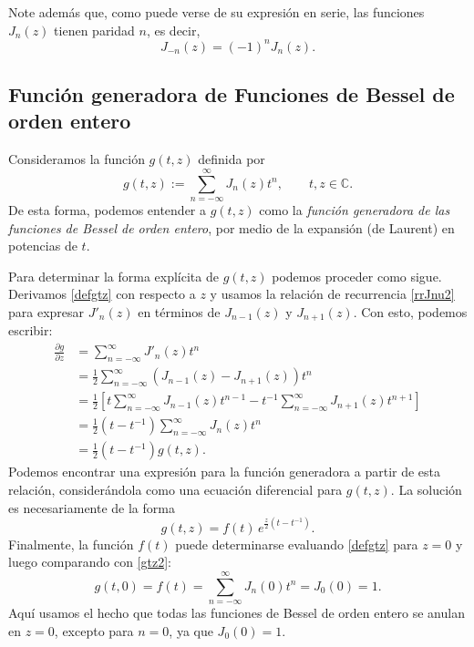 Note además que, como puede verse de su expresión en serie, las funciones $J_n(z)$ tienen paridad $n$, es decir,
\begin{equation}\label{J-nJn}
J_{-n}(z)=(-1)^nJ_n(z).
\end{equation}

\subsection{Función generadora de Funciones de Bessel de orden entero}
Consideramos la función $g(t,z)$ definida por
\begin{equation}\label{defgtz}
g(t,z):=\sum_{n = -\infty}^\infty J_n(z) t^n, \qquad t,z\in \mathbb{C}.
\end{equation}
De esta forma, podemos entender a $g(t,z)$ como la \textit{función generadora de las funciones de Bessel de orden entero}, por medio de la expansión (de Laurent) en potencias de $t$.

Para determinar la forma explícita de $g(t,z)$ podemos proceder como sigue. Derivamos \eqref{defgtz} con respecto a $z$ y usamos la relación de recurrencia \eqref{rrJnu2} para expresar $J'_n(z)$ en términos de  $J_{n-1}(z)$ y $J_{n+1}(z)$. Con esto, podemos escribir:
\begin{align}
\frac{\partial g}{\partial z} &= \sum_{n=-\infty}^\infty J'_n(z) t^n \\
&= \frac{1}{2}\sum_{n=-\infty}^\infty \left(J_{n-1}(z)-J_{n+1}(z)\right) t^n \\
&= \frac{1}{2}\left[t\sum_{n=-\infty}^\infty J_{n-1}(z)t^{n-1}-t^{-1}\sum_{n=-\infty}^\infty J_{n+1}(z)t^{n+1} \right]\\
&= \frac{1}{2}\left(t-t^{-1}\right)\sum_{n = -\infty}^\infty J_n(z) t^n\\
&= \frac{1}{2}\left(t-t^{-1}\right)g(t,z).
\end{align}
Podemos encontrar una expresión para la función generadora a partir de esta relación, considerándola como una ecuación diferencial para $g(t,z)$. La solución es necesariamente de la forma
\begin{equation}\label{gtz2}
g(t,z)=f(t)\,e^{\frac{z}{2}\left(t-t^{-1}\right)}.
\end{equation}
Finalmente, la función $f(t)$ puede determinarse evaluando \eqref{defgtz} para $z=0$ y luego comparando con \eqref{gtz2}:
\begin{equation}\label{gtz3}
g(t,0)=f(t)=\sum_{n = -\infty}^\infty J_n(0) t^n=J_0(0)=1.
\end{equation}
Aquí usamos el hecho que todas las funciones de Bessel de orden entero se anulan en $z=0$, excepto para $n=0$, ya que $J_0(0)=1$.

